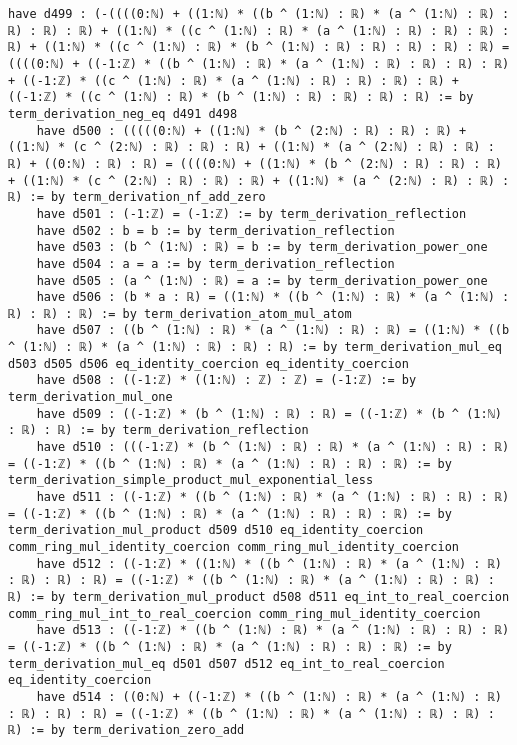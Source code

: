 \documentclass{article}
\begin{document}
\begin{tcolorbox}[colback=white!10, width=\linewidth]
\begin{lstlisting}[language=Lean4]
    have d499 : (-((((0:ℕ) + ((1:ℕ) * ((b ^ (1:ℕ) : ℝ) * (a ^ (1:ℕ) : ℝ) : ℝ) : ℝ) : ℝ) + ((1:ℕ) * ((c ^ (1:ℕ) : ℝ) * (a ^ (1:ℕ) : ℝ) : ℝ) : ℝ) : ℝ) + ((1:ℕ) * ((c ^ (1:ℕ) : ℝ) * (b ^ (1:ℕ) : ℝ) : ℝ) : ℝ) : ℝ) : ℝ) = ((((0:ℕ) + ((-1:ℤ) * ((b ^ (1:ℕ) : ℝ) * (a ^ (1:ℕ) : ℝ) : ℝ) : ℝ) : ℝ) + ((-1:ℤ) * ((c ^ (1:ℕ) : ℝ) * (a ^ (1:ℕ) : ℝ) : ℝ) : ℝ) : ℝ) + ((-1:ℤ) * ((c ^ (1:ℕ) : ℝ) * (b ^ (1:ℕ) : ℝ) : ℝ) : ℝ) : ℝ) := by term_derivation_neg_eq d491 d498
    have d500 : (((((0:ℕ) + ((1:ℕ) * (b ^ (2:ℕ) : ℝ) : ℝ) : ℝ) + ((1:ℕ) * (c ^ (2:ℕ) : ℝ) : ℝ) : ℝ) + ((1:ℕ) * (a ^ (2:ℕ) : ℝ) : ℝ) : ℝ) + ((0:ℕ) : ℝ) : ℝ) = ((((0:ℕ) + ((1:ℕ) * (b ^ (2:ℕ) : ℝ) : ℝ) : ℝ) + ((1:ℕ) * (c ^ (2:ℕ) : ℝ) : ℝ) : ℝ) + ((1:ℕ) * (a ^ (2:ℕ) : ℝ) : ℝ) : ℝ) := by term_derivation_nf_add_zero
    have d501 : (-1:ℤ) = (-1:ℤ) := by term_derivation_reflection
    have d502 : b = b := by term_derivation_reflection
    have d503 : (b ^ (1:ℕ) : ℝ) = b := by term_derivation_power_one
    have d504 : a = a := by term_derivation_reflection
    have d505 : (a ^ (1:ℕ) : ℝ) = a := by term_derivation_power_one
    have d506 : (b * a : ℝ) = ((1:ℕ) * ((b ^ (1:ℕ) : ℝ) * (a ^ (1:ℕ) : ℝ) : ℝ) : ℝ) := by term_derivation_atom_mul_atom
    have d507 : ((b ^ (1:ℕ) : ℝ) * (a ^ (1:ℕ) : ℝ) : ℝ) = ((1:ℕ) * ((b ^ (1:ℕ) : ℝ) * (a ^ (1:ℕ) : ℝ) : ℝ) : ℝ) := by term_derivation_mul_eq d503 d505 d506 eq_identity_coercion eq_identity_coercion
    have d508 : ((-1:ℤ) * ((1:ℕ) : ℤ) : ℤ) = (-1:ℤ) := by term_derivation_mul_one
    have d509 : ((-1:ℤ) * (b ^ (1:ℕ) : ℝ) : ℝ) = ((-1:ℤ) * (b ^ (1:ℕ) : ℝ) : ℝ) := by term_derivation_reflection
    have d510 : (((-1:ℤ) * (b ^ (1:ℕ) : ℝ) : ℝ) * (a ^ (1:ℕ) : ℝ) : ℝ) = ((-1:ℤ) * ((b ^ (1:ℕ) : ℝ) * (a ^ (1:ℕ) : ℝ) : ℝ) : ℝ) := by term_derivation_simple_product_mul_exponential_less
    have d511 : ((-1:ℤ) * ((b ^ (1:ℕ) : ℝ) * (a ^ (1:ℕ) : ℝ) : ℝ) : ℝ) = ((-1:ℤ) * ((b ^ (1:ℕ) : ℝ) * (a ^ (1:ℕ) : ℝ) : ℝ) : ℝ) := by term_derivation_mul_product d509 d510 eq_identity_coercion comm_ring_mul_identity_coercion comm_ring_mul_identity_coercion
    have d512 : ((-1:ℤ) * ((1:ℕ) * ((b ^ (1:ℕ) : ℝ) * (a ^ (1:ℕ) : ℝ) : ℝ) : ℝ) : ℝ) = ((-1:ℤ) * ((b ^ (1:ℕ) : ℝ) * (a ^ (1:ℕ) : ℝ) : ℝ) : ℝ) := by term_derivation_mul_product d508 d511 eq_int_to_real_coercion comm_ring_mul_int_to_real_coercion comm_ring_mul_identity_coercion
    have d513 : ((-1:ℤ) * ((b ^ (1:ℕ) : ℝ) * (a ^ (1:ℕ) : ℝ) : ℝ) : ℝ) = ((-1:ℤ) * ((b ^ (1:ℕ) : ℝ) * (a ^ (1:ℕ) : ℝ) : ℝ) : ℝ) := by term_derivation_mul_eq d501 d507 d512 eq_int_to_real_coercion eq_identity_coercion
    have d514 : ((0:ℕ) + ((-1:ℤ) * ((b ^ (1:ℕ) : ℝ) * (a ^ (1:ℕ) : ℝ) : ℝ) : ℝ) : ℝ) = ((-1:ℤ) * ((b ^ (1:ℕ) : ℝ) * (a ^ (1:ℕ) : ℝ) : ℝ) : ℝ) := by term_derivation_zero_add

\end{lstlisting}
\end{tcolorbox}
\end{document}
